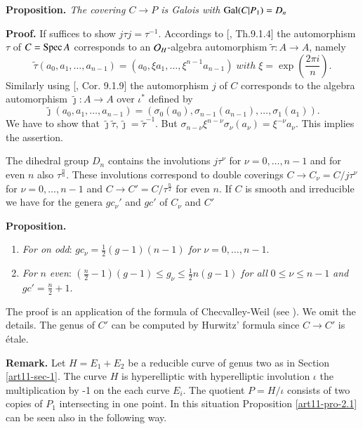 \medskip
\noindent
{\bfseries {} Proposition. \label{art11-pro-2.1}} \textit{The covering $C\rightarrow P$ is Galois with $\operatorname{Gal}(C|P_{1}) =D_{n}$}

\medskip
\noindent
{\bfseries Proof.} If suffices to show $j\tau j =\tau^{-1}$. Accordings to [\cite{art11-keyEGAI}, Th.9.1.4] the automorphism $\tau$ of $C=\operatorname{Spec} A$ corresponds to an $\mathcal{O}_{H}$-algebra automorphism $\tilde{\tau}: A\rightarrow A$, namely
$$
\tilde{\tau}(a_{0}, a_{1}, \ldots, a_{n-1}) =(a_{0}, \xi a_{1}, \ldots, \xi^{n-1}a_{n-1})\; with \;\xi = \exp \left(\frac{2\pi i}{n}\right).
$$ 
Similarly using [\cite{art11-keyEGAI}, Cor. 9.1.9] the automorphism $j$ of $C$ corresponds to the algebra automorphism $\tilde{\jmath} : A\rightarrow A$ over $\iota^{*}$ defined by
$$
\tilde{\jmath} (a_{0}, a_{1}, \ldots, a_{n-1}) = (\sigma_{0}(a_{0}), \sigma_{n-1}(a_{n-1}), \ldots, \sigma_{1}(a_{1})).
$$
We have to show that $\tilde{\jmath}\tilde{\tau}, \tilde{\jmath} = \tilde{\tau}^{-1}$. But $\sigma_{n-\nu}\xi^{n-\nu}\sigma_{\nu}(a_{\nu}) = \xi^{-\nu}a_{\nu}$. This implies the assertion.

\noindent
The dihedral group $D_{n}$ contains the involutions $j\tau^{\nu}$ for $\nu = 0,\ldots,n-1$ and for even $n$ also $\tau^{\frac{n}{n}}$. These involutions correspond to double coverings $C\rightarrow C_{\nu} = C/j\tau^{\nu}$ for $\nu =0, \ldots,n-1$ and $C\rightarrow C'= C/\tau^{\frac{n}{2}}$ for even $n$. If $C$ is smooth and irreducible we have for the genera $gc_{\nu}'$ and $gc'$ of $C_{\nu}$ and $C'$ 

\medskip
\noindent
{\bfseries {} Proposition.\label{art11-prop-2.2}}
~

\begin{enumerate}[{\it a)}]
 \item \textit{For on odd}: $gc_{\nu} = \frac{1}{2}(g-1)(n-1)$ \textit{for} $\nu =0,\ldots,
  n-1$.\label{art11-prop2.2-enum-1}
 \item \textit{For} $n$ \textit{even}: $(\frac{n}{2}-1)(g-1) \leq g_{\nu}\leq \frac{1}{2}n(g-1)$ \textit{for all} $0 \leq \nu \leq n-1$ \textit{and} $gc' =\frac{n}{2}+1$.\label{art11-prop2.2-enum-2}
\end{enumerate}

The proof is an application of the formula of Checvalley-Weil (see \cite{art11-keyC-W}). We omit the details. The genus of $C'$ can be computed by Hurwitz' formula since $C\rightarrow C'$ is \'etale.

\medskip
\noindent
{\bfseries {} Remark.\label{art11-remark-2.3}} Let $ H =E_{1}+ E_{2}$ be a reducible curve of genus two as in Section \ref{art11-sec-1}. The curve $H$ is hyperelliptic with hyperelliptic involution $\iota$ the multiplication by -1 on the each curve $E_{i}$. The quotient $P=H /\iota$ consists of two copies of $P_{1}$ intersecting in one point. In this situation Proposition \ref{art11-pro-2.1} can be seen also in the following way.

